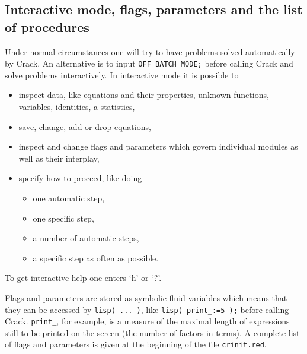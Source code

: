 \documentclass[12pt]{article}
\begin{document}
\subsection{Interactive mode, flags, parameters and the list of procedures}
Under normal circumstances one will try to have problems solved
automatically by {\sc Crack}. An alternative is to input
{\tt OFF BATCH\_MODE;} before calling {\sc Crack} and solve problems
interactively. In interactive mode it is possible to
\begin{itemize}
\item inspect data, like equations and their properties, unknown
functions, variables, identities, a statistics,
\item save, change, add or drop equations,
\item inspect and change flags and parameters which govern individual
modules as well as their interplay,
\item specify how to proceed, like doing
 \begin{itemize}
 \item one automatic step,
 \item one specific step,
 \item a number of automatic steps,
 \item a specific step as often as possible.
 \end{itemize}
\end{itemize}
To get interactive help one enters `h' or `?'.

Flags and parameters are stored as symbolic fluid variables
which means that they can be accessed by {\tt lisp( ... )},
like {\tt lisp( print\_:=5 );} before calling {\sc Crack}.
{\tt print\_}, for example, is a measure of the maximal
length of expressions still to be printed on the screen
(the number of factors in terms).
A complete list of flags and parameters is given at the beginning of
the file {\tt crinit.red}. 
\end{document}
